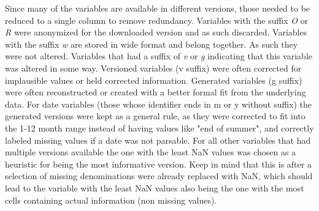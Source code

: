 Since many of the variables are available in different versions, those needed to be reduced to a single column to remove redundancy. Variables with the suffix \textit{O} or \textit{R} were anonymized for the downloaded version and as such discarded. Variables with the suffix \textit{w} are stored in wide format and belong together. As such they were not altered. Variables that had a suffix of \textit{v} or \textit{g} indicating that this variable was altered in some way. Versioned variables (v suffix) were often corrected for implausible values or held corrected information. Generated variables (g suffix) were often reconstructed or created with a better formal fit from the underlying data. For date variables (those whose identifier ends in m or y without suffix) the generated versions were kept as a general rule, as they were corrected to fit into the 1-12 month range instead of having values like "end of summer", and correctly labeled missing values if a date was not parsable. For all other variables that had multiple versions available the one with the least NaN values was chosen as a heuristic for being the most informative version. Keep in mind that this is after a selection of missing denominations were already replaced with NaN, which should lead to the variable with the least NaN values also being the one with the most cells containing actual information (non missing values).

